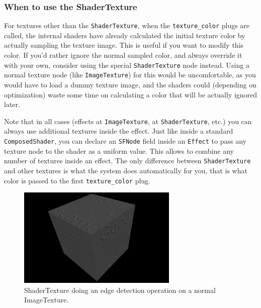 \documentclass{egpubl}
\begin{document}
\subsubsection{When to use the ShaderTexture}

For textures other than the \texttt{ShaderTexture},
when the \texttt{texture\_color} plugs are called,
the internal shaders have already calculated the initial texture
color by actually sampling the texture image. This is useful if you
want to modify this color. If you'd rather ignore the normal
sampled color, and always override it with your own, consider using
the special \texttt{ShaderTexture} node instead. Using
a normal texture node (like \texttt{ImageTexture}) for this
would be uncomfortable, as you would have to load a dummy texture image,
and the shaders could (depending on optimization) waste some time
on calculating a color that will be actually ignored later.

Note that in all cases (effects at \texttt{ImageTexture},
at \texttt{ShaderTexture}, etc.) you can always use additional
textures inside the effect. Just like inside a standard \texttt{ComposedShader},
you can declare an \texttt{SFNode} field inside an \texttt{Effect}
to pass any texture node to the shader as a uniform value.
This allows to combine any number of textures inside an effect.
The only difference
between \texttt{ShaderTexture} and other textures is what the system
does automatically for you, that is what color is passed
to the first \texttt{texture\_color} plug.

\begin{figure}[H]
  \centering
  \includegraphics[width=3in]{shader_texture_edge_detection}
  \caption{ShaderTexture doing an edge detection operation on a normal ImageTexture.}
\end{figure}

\end{document}
